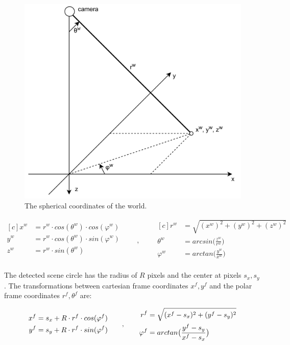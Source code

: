 \documentclass[a4paper,11pt,titlepage,twoside]{article}
\numberwithin{figure}{section}
\begin{document}
\begin{figure}[h]
\centering
\includegraphics[width=0.5\linewidth]{fig/sphere.png}
\caption{The spherical coordinates of the world.}
\label{fig:sphere}
\end{figure}


\begin{equation}
\begin{aligned}[c]
x^w &= r^w \cdot cos(\theta^w) \cdot cos(\varphi^w) \\
y^w &= r^w \cdot cos(\theta^w) \cdot sin(\varphi^w) \\
z^w &= r^w \cdot sin(\theta^w) \\
\end{aligned}
\qquad,\qquad
\begin{aligned}[c]
r^w &= \sqrt{(x^w)^2 + (y^w)^2 + (z^w)^2} \\
\theta^w &= arcsin\Big(\frac{z^w}{r^w}\Big) \\
\varphi^w &= arctan\Big(\frac{y^w}{x^w}\Big) \\
\end{aligned}
\end{equation}



The detected scene circle has the radius of $R$ pixels and the center at pixels $s_x, s_y$. The transformations between cartesian frame coordinates $x^f, y^f$ and the polar frame coordinates $r^f, \theta^f$ are:

\begin{equation}
\begin{aligned}[c]
x^f &= s_x + R \cdot r^f \cdot cos(\varphi^f) \\
y^f &= s_y + R \cdot r^f \cdot sin(\varphi^f) \\
\end{aligned}
\qquad,\qquad
\begin{aligned}[c]
r^f &= \sqrt{(x^f - s_x)^2 + (y^f - s_y)^2} \\
\varphi^f &= arctan\big{(}\frac{y^f - s_y}{x^f - s_x}\big{)}
\end{aligned}
\end{equation}
\end{document}
